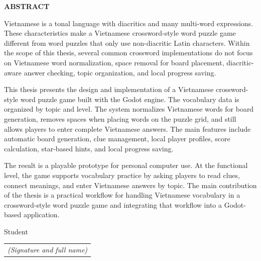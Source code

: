 \documentclass[../DoAn.tex]{subfiles}
\begin{document}
\begin{center}
    {\Large\textbf{ABSTRACT}}\\
\end{center}
\vspace{1cm}

Vietnamese is a tonal language with diacritics and many multi-word expressions. These characteristics make a Vietnamese crossword-style word puzzle game different from word puzzles that only use non-diacritic Latin characters. Within the scope of this thesis, several common crossword implementations do not focus on Vietnamese word normalization, space removal for board placement, diacritic-aware answer checking, topic organization, and local progress saving.

This thesis presents the design and implementation of a Vietnamese crossword-style word puzzle game built with the Godot engine. The vocabulary data is organized by topic and level. The system normalizes Vietnamese words for board generation, removes spaces when placing words on the puzzle grid, and still allows players to enter complete Vietnamese answers. The main features include automatic board generation, clue management, local player profiles, score calculation, star-based hints, and local progress saving.

The result is a playable prototype for personal computer use. At the functional level, the game supports vocabulary practice by asking players to read clues, connect meanings, and enter Vietnamese answers by topic. The main contribution of the thesis is a practical workflow for handling Vietnamese vocabulary in a crossword-style word puzzle game and integrating that workflow into a Godot-based application.

\begin{flushright}
Student\\
\begin{tabular}{@{}c@{}}
\textit{(Signature and full name)}
\end{tabular}
\end{flushright}
\end{document}
